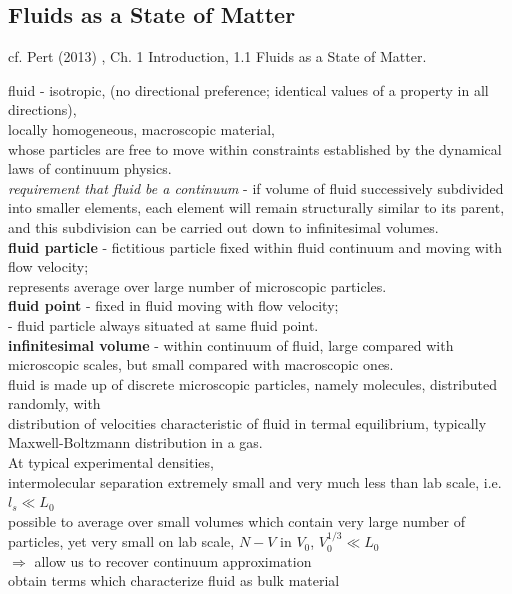 \documentclass[10pt]{amsart}
\begin{document}
\begin{multicols*}{2}
\subsection{Fluids as a State of Matter}

cf. Pert (2013) \cite{Pert2013}, Ch. 1 Introduction, 1.1 Fluids as a State of Matter.

fluid - isotropic, (no directional preference; identical values of a property in all directions), \\
locally homogeneous, macroscopic material, \\
whose particles are free to move within constraints established by the dynamical laws of continuum physics. \\
\emph{requirement that fluid be a continuum} - if volume of fluid successively subdivided into smaller elements, each element will remain structurally similar to its parent, and this subdivision can be carried out down to infinitesimal volumes. \\

\textbf{fluid particle} - fictitious particle fixed within fluid continuum and moving with flow velocity; \\
represents average over large number of microscopic particles. \\

\textbf{fluid point} - fixed in fluid moving with flow velocity; \\
- fluid particle always situated at same fluid point. \\

\textbf{infinitesimal volume} - within continuum of fluid, large compared with microscopic scales, but small compared with macroscopic ones. \\

fluid is made up of discrete microscopic particles, namely molecules, distributed randomly, with \\
distribution of velocities characteristic of fluid in termal equilibrium, typically Maxwell-Boltzmann distribution in a gas. \\

At typical experimental densities, \\
intermolecular separation extremely small and very much less than lab scale, i.e. $l_s \ll L_0$ \\
possible to average over small volumes which contain very large number of particles, yet very small on lab scale, $N-V$ in $V_0$, $V_0^{1/3} \ll L_0$ \\
$\Longrightarrow$ allow us to recover continuum approximation \\
obtain terms which characterize fluid as bulk material \\


\end{multicols*}
\end{document}

